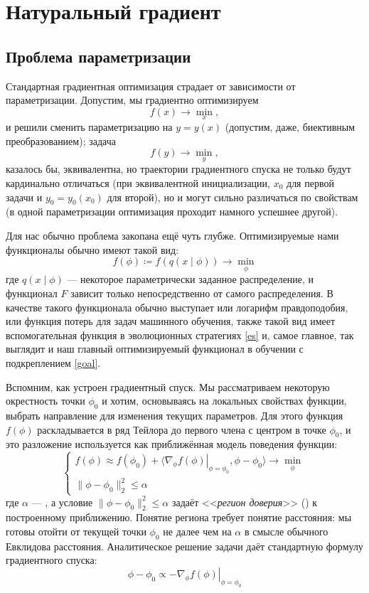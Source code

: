 \section{Натуральный градиент}\label{appendix:ng}

\subsection{Проблема параметризации}

Стандартная градиентная оптимизация страдает от зависимости от параметризации. Допустим, мы градиентно оптимизируем
$$f(x) \to \min_x ,$$
и решили сменить параметризацию на $y = y(x)$ (допустим, даже, биективным преобразованием); задача
$$f(y) \to \min_y ,$$
казалось бы, эквивалентна, но траектории градиентного спуска не только будут кардинально отличаться (при эквивалентной инициализации, $x_0$ для первой задачи и $y_0 = y_0(x_0)$ для второй), но и могут сильно различаться по свойствам (в одной параметризации оптимизация проходит намного успешнее другой).

Для нас обычно проблема закопана ещё чуть глубже. Оптимизируемые нами функционалы обычно имеют такой вид:
\begin{equation}\label{NGmotivation}
f(\phi) \coloneqq f(q(x \mid \phi)) \to \min_\phi
\end{equation}
где $q(x \mid \phi)$ --- некоторое параметрически заданное распределение, и функционал $F$ зависит только непосредственно от самого распределения. В качестве такого функционала обычно выступает или логарифм правдоподобия, или функция потерь для задач машинного обучения, также такой вид имеет вспомогательная функция в эволюционных стратегиях \eqref{es} и, самое главное, так выглядит и наш главный оптимизируемый функционал в обучении с подкреплением \eqref{goal}.

Вспомним, как устроен градиентный спуск. Мы рассматриваем некоторую окрестность точки $\phi_0$ и хотим, основываясь на локальных свойствах функции, выбрать направление для изменения текущих параметров. Для этого функция $f(\phi)$ раскладывается в ряд Тейлора до первого члена с центром в точке $\phi_0$, и это разложение используется как приближённая модель поведения функции:
$$\begin{cases}
f(\phi) \approx f(\phi_0) + \langle \left. \nabla_\phi f(\phi) \right|_{\phi = \phi_0}, \phi - \phi_0 \rangle \to \min\limits_{\phi} \\
\|\phi - \phi_0\|_2^2 \le \alpha
\end{cases}$$
где $\alpha$ --- , а условие $\|\phi - \phi_0\|_2^2 \le \alpha$ задаёт <<\emph{регион доверия}>> () к построенному приближению. Понятие региона требует понятие расстояния: мы готовы отойти от текущей точки $\phi_0$ не далее чем на $\alpha$ в смысле обычного Евклидова расстояния. Аналитическое решение задачи даёт стандартную формулу градиентного спуска:
$$\phi - \phi_0 \propto - \left. \nabla_\phi f(\phi) \right|_{\phi = \phi_0}$$

